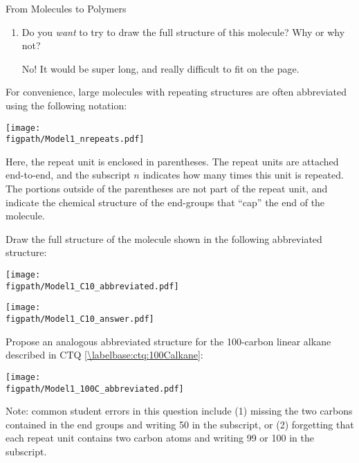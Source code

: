 \begin{activity}{From Molecules to Polymers}
\begin{ctqs}
\begin{enumerate}
			\item Do you \emph{want} to try to draw the full structure of this molecule?  Why or why not?
			
				\begin{solution}[1.25in]{}
					No!  It would be super long, and really difficult to fit on the page.
				\end{solution}
		\end{enumerate}
\end{ctqs}

\begin{infobox}
	For convenience, large molecules with repeating structures are often abbreviated using the following notation:
	
	\centerline{\texttt{[image: \\figpath/Model1\_nrepeats.pdf]}}
	
	Here, the repeat unit is enclosed in parentheses.  The repeat units are attached end-to-end, and the subscript $n$ indicates how many times this unit is repeated.  The portions outside of the parentheses are not part of the repeat unit, and indicate the chemical structure of the end-groups that ``cap'' the end of the molecule.
\end{infobox}

\begin{ctqs}
	\question Draw the full structure of the molecule shown in the following abbreviated structure: \label{\labelbase:ctq:abbrevbutane}
	
		\vspace{6pt}
		\centerline{\texttt{[image: \\figpath/Model1\_C10\_abbreviated.pdf]}}
		
		\begin{solution}[1.25in]{}
			\centerline{\texttt{[image: \\figpath/Model1\_C10\_answer.pdf]}}
		\end{solution}
	
	\question Propose an analogous abbreviated structure for the 100-carbon linear alkane described in CTQ \ref{\labelbase:ctq:100Calkane}: \label{\labelbase:ctq:abbrev100}
		
		\begin{solution}[0.75in]{}
				\centerline{\texttt{[image: \\figpath/Model1\_100C\_abbreviated.pdf]}}
				
				Note: common student errors in this question include (1) missing the two carbons contained in the end groups and writing 50 in the subscript, or (2) forgetting that each repeat unit contains two carbon atoms and writing 99 or 100 in the subscript.
		\end{solution}
	

\end{ctqs}
\end{activity}
